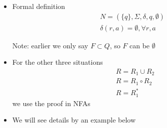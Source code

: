 \begin{frame}[allowframebreaks]
\begin{itemize}
\item [] Formal definition
\begin{gather*}
  N=(\{q\}, \Sigma, \delta, q, \emptyset)\\
\delta(r,a)=\emptyset, \forall r, a
\end{gather*}

Note: earlier we only say $F \subset Q$,
so $F$ can be $\emptyset$

\item For the other three situations
  \begin{equation*}
    \begin{split}
& R=R_1\cup R_2\\
& R=R_1 \circ R_2\\
& R=R_1^*
\end{split}
\end{equation*}
we use the proof in NFAs
\item We will see details by an example below
\end{itemize}\end{frame}

